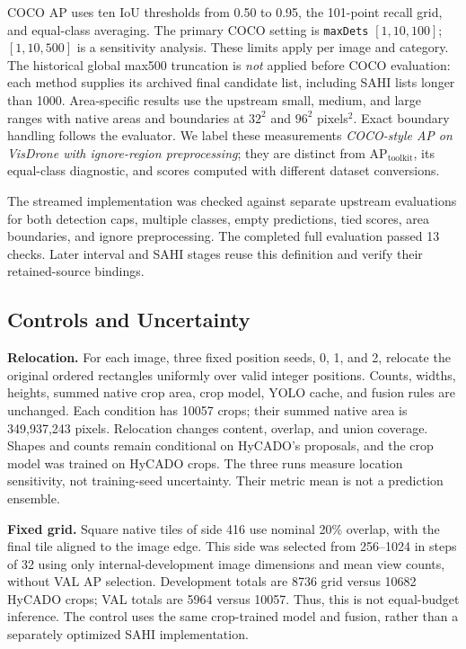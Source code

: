 \documentclass[journal]{IEEEtran}
\newcommand{\APlit}{\mathrm{AP}_{\mathrm{toolkit}}}
\begin{document}
COCO AP uses ten IoU thresholds from 0.50 to 0.95, the 101-point recall grid, and equal-class averaging. The primary COCO setting is \texttt{maxDets} $[1,10,100]$; $[1,10,500]$ is a sensitivity analysis. These limits apply per image and category. The historical global max500 truncation is \emph{not} applied before COCO evaluation: each method supplies its archived final candidate list, including SAHI lists longer than 1000. Area-specific results use the upstream small, medium, and large ranges with native areas and boundaries at $32^2$ and $96^2$ pixels$^2$. Exact boundary handling follows the evaluator. We label these measurements \emph{COCO-style AP on VisDrone with ignore-region preprocessing}; they are distinct from $\APlit$, its equal-class diagnostic, and scores computed with different dataset conversions.

The streamed implementation was checked against separate upstream evaluations for both detection caps, multiple classes, empty predictions, tied scores, area boundaries, and ignore preprocessing. The completed full evaluation passed 13 checks. Later interval and SAHI stages reuse this definition and verify their retained-source bindings.

\subsection{Controls and Uncertainty}
\textbf{Relocation.} For each image, three fixed position seeds, 0, 1, and 2, relocate the original ordered rectangles uniformly over valid integer positions. Counts, widths, heights, summed native crop area, crop model, YOLO cache, and fusion rules are unchanged. Each condition has 10057 crops; their summed native area is 349,937,243 pixels. Relocation changes content, overlap, and union coverage. Shapes and counts remain conditional on HyCADO's proposals, and the crop model was trained on HyCADO crops. The three runs measure location sensitivity, not training-seed uncertainty. Their metric mean is not a prediction ensemble.

\textbf{Fixed grid.} Square native tiles of side 416 use nominal 20\% overlap, with the final tile aligned to the image edge. This side was selected from 256--1024 in steps of 32 using only internal-development image dimensions and mean view counts, without VAL AP selection. Development totals are 8736 grid versus 10682 HyCADO crops; VAL totals are 5964 versus 10057. Thus, this is not equal-budget inference. The control uses the same crop-trained model and fusion, rather than a separately optimized SAHI implementation.
\end{document}
